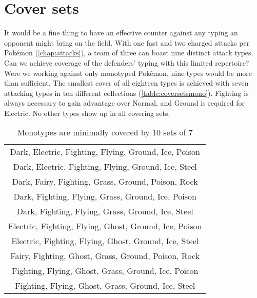 \section{Cover sets}
It would be a fine thing to have an effective counter against any typing
  an opponent might bring on the field.
With one fast and two charged attacks per Pokémon (\autoref{chap:attacks}),
  a team of three can boast nine distinct attack types.
Can we achieve coverage of the defenders' typing with this limited repertoire?
Were we working against only monotyped Pokémon, nine types would be more than sufficient.
The smallest cover of all eighteen types is achieved with seven attacking types in
  ten different collections (\autoref{table:coversetsmono}).
Fighting is always necessary to gain advantage over Normal, and Ground is required for Electric.
No other types show up in all covering sets.
\begin{table}[ht]
\begin{centering}
  \begin{tabular}{c}
 Dark, Electric, Fighting, Flying, Ground, Ice, Poison\\
 Dark, Electric, Fighting, Flying, Ground, Ice, Steel\\
 Dark, Fairy, Fighting, Grass, Ground, Poison, Rock\\
 Dark, Fighting, Flying, Grass, Ground, Ice, Poison\\
 Dark, Fighting, Flying, Grass, Ground, Ice, Steel\\
 Electric, Fighting, Flying, Ghost, Ground, Ice, Poison\\
 Electric, Fighting, Flying, Ghost, Ground, Ice, Steel\\
 Fairy, Fighting, Ghost, Grass, Ground, Poison, Rock\\
 Fighting, Flying, Ghost, Grass, Ground, Ice, Poison\\
 Fighting, Flying, Ghost, Grass, Ground, Ice, Steel\\
  \end{tabular}
  \label{table:coversetsmono}
  \caption{Monotypes are minimally covered by 10 sets of 7}
\end{centering}
\end{table}

